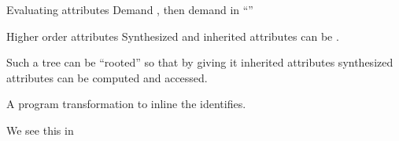 \documentclass[11pt,aspectratio=169]{beamer}
\newcommand{\ys}{1.3}
\newcommand{\enve}[2]{\draw[blue] ($(#1-0.4,\ys*#2-0.35)$) circle(0.15);}
\newcommand{\envd}[2]{\filldraw[blue] ($(#1-0.4,\ys*#2-0.35)$) circle(0.05);}
\newcommand{\envc}[2]{\filldraw[blue] ($(#1-0.4,\ys*#2-0.35)$) circle(0.15);}
\newcommand{\ppe}[2]{\draw[dgreen] ($(#1+0.4,\ys*#2-0.35)$) circle(0.15);}
\newcommand{\ppd}[2]{\filldraw[dgreen] ($(#1+0.4,\ys*#2-0.35)$) circle(0.05);}
\newcommand{\ppc}[2]{\filldraw[dgreen] ($(#1+0.4,\ys*#2-0.35)$) circle(0.15);}
\newcommand{\vale}[2]{\draw[red] ($(#1+0.8,\ys*#2-0.35)$) circle(0.15);}
\newcommand{\vald}[2]{\filldraw[red] ($(#1+0.8,\ys*#2-0.35)$) circle(0.05);}
\newcommand{\valc}[2]{\filldraw[red] ($(#1+0.8,\ys*#2-0.35)$) circle(0.15);}
\newcommand{\erre}[2]{\draw[orange] ($(#1+1.2,\ys*#2-0.35)$) circle(0.15);}
\newcommand{\rtn}[3]{
\draw ($(#1,#2*\ys)$) node{#3};
\ppe{#1}{#2}
\vale{#1}{#2}

\draw[gray] ($(#1+0.65,\ys*#2+0.25)$) --
            ($(#1-0.3,\ys*#2+0.25)$) arc (90:270:4.5mm);

\draw[gray] ($(#1+0.65,\ys*#2+0.25)$) arc (90:-90:4.5mm) -- 
            ($(#1-0.3,\ys*#2-0.65)$) ;
}
\newcommand{\tn}[3]{
\rtn{#1}{#2}{#3}
\enve{#1}{#2}
}
\newcommand{\tnstr}[3]{
\draw ($(#1,#2*\ys)$) node{#3};
\draw[gray] ($(#1+0.25,\ys*#2+0.25)$) --
            ($(#1-0.2,\ys*#2+0.25)$) arc (90:270:2.5mm);

\draw[gray] ($(#1+0.25,\ys*#2+0.25)$) arc (90:-90:2.5mm) -- 
            ($(#1-0.2,\ys*#2-0.25)$) ;

}
\newcommand{\tedge}[4]{
\draw[gray] ($(#1+\xsh,\ys*#2-0.65)$) -- ($(#3+\xsh,\ys*#4+0.25)$);
}
\newcommand{\ppeval}{
\pause
\ppd{4}{4} %
\pause
\ppd{4}{3} %

\pause
\ppd{4}{2} %
\pause
\ppc{4}{2} %
\pause
\ppd{6.5}{2}  %

\pause
\ppd{5.25}{1} %
\pause
\ppc{5.25}{1} %
\pause
\ppd{7.75}{1} %
\pause
\ppc{7.75}{1} %

\pause
\ppc{6.5}{2}  %

\pause
\ppc{4}{3} %

\pause
\ppc{4}{4} %
}
\newcommand{\valeval}{
\pause\vald{4}{4} %
\pause\vald{4}{3} %

\pause\vald{6.5}{2}  %
\pause\vald{5.25}{1} %
\pause\valc{5.25}{1} %

\pause\vald{7.75}{1} %

\pause\envd{7.75}{1} %

\pause\envd{6.5}{2}  %

\pause
\draw ($(5.5,\ys*-0.5)$) node {\small\texttt{body.env = addEnv(name, dval.val, e.env);}};

\pause\vald{4}{2} %
\pause\valc{4}{2} %

\pause\envd{4}{3} %
\pause\envc{4}{3} %

\pause\envc{6.5}{2}  %

\pause
\draw[white] ($(5.5,\ys*-0.5)$) node {\small\texttt{body.env = addEnv(name, dval.val, e.env);}};

\pause\envc{7.75}{1} %

\pause\valc{7.75}{1} %
\pause\valc{6.5}{2}  %

\pause\valc{4}{3} %

\pause\valc{4}{4} %
}
\newcommand{\xsh}{0.15}
\begin{document}
\begin{frame}[t,fragile]{Evaluating attributes}
Demand , then demand  in ``''

\bigskip

\begin{minipage}[t]{2.9in}
\vspace{0pt}
\end{minipage}
\begin{minipage}[t]{2.1in}
\vspace{0pt}

\end{minipage}
\end{frame}


\begin{frame}{Higher order attributes}
\biA
 \x Synthesized and inherited attributes can be .

 \x Such a tree can be ``rooted'' so that
  \bi
   \x by giving it inherited attributes
   \x synthesized attributes can be computed and accessed.
  \ei

 \x {}

    \medskip
    A program transformation to inline the identifies.

 \x We see this in 
\ei
\end{frame}
\end{document}
